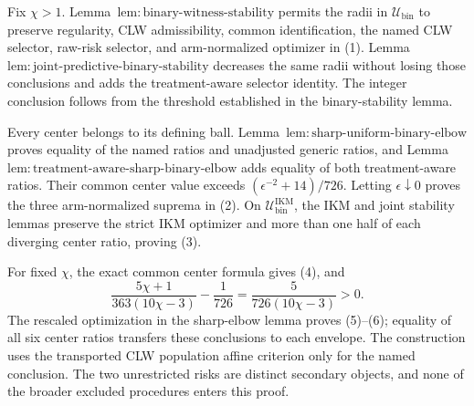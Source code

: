 Fix \(\chi>1\).  Lemma~\(\mathrm{lem{:}binary\text{-}witness\text{-}stability}\) permits the radii in \(\mathcal U_{\mathrm{bin}}\) to preserve regularity, CLW admissibility, common identification, the named CLW selector, raw-risk selector, and arm-normalized optimizer in (1).  Lemma~\(\mathrm{lem{:}joint\text{-}predictive\text{-}binary\text{-}stability}\) decreases the same radii without losing those conclusions and adds the treatment-aware selector identity.  The integer conclusion follows from the threshold established in the binary-stability lemma.

Every center belongs to its defining ball.  Lemma~\(\mathrm{lem{:}sharp\text{-}uniform\text{-}binary\text{-}elbow}\) proves equality of the named ratios and unadjusted generic ratios, and Lemma~\(\mathrm{lem{:}treatment\text{-}aware\text{-}sharp\text{-}binary\text{-}elbow}\) adds equality of both treatment-aware ratios.  Their common center value exceeds \((\epsilon^{-2}+14)/726\).  Letting \(\epsilon\downarrow0\) proves the three arm-normalized suprema in (2).  On \(\mathcal U_{\mathrm{bin}}^{\mathrm{IKM}}\), the IKM and joint stability lemmas preserve the strict IKM optimizer and more than one half of each diverging center ratio, proving (3).

For fixed \(\chi\), the exact common center formula gives (4), and
\[
 \frac{5\chi+1}{363(10\chi-3)}-\frac1{726}
 =\frac5{726(10\chi-3)}>0.                                \tag{41}
\]
The rescaled optimization in the sharp-elbow lemma proves (5)--(6); equality of all six center ratios transfers these conclusions to each envelope.  The construction uses the transported CLW population affine criterion only for the named conclusion.  The two unrestricted risks are distinct secondary objects, and none of the broader excluded procedures enters this proof.
